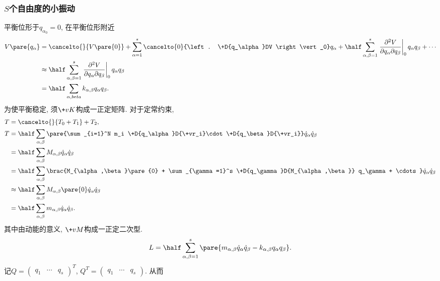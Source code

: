 \documentclass{ctexart}
\begin{document}

\subsubsection{\texorpdfstring{$S$}{S}个自由度的小振动} %
\label{ssub:s个自由度的小振动}

平衡位形于$q_{\alpha_0} = 0$, 在平衡位形附近
\begin{align*}
    V\pare{q_\alpha} &= \cancelto{}{V\pare{0}} + \sum_{\alpha=1}^s \cancelto{0}{\left. \+D{q_\alpha}DV \right\vert_0} q_\alpha + \half\sum_{\alpha,\beta=1}^s \left. \frac{\partial^2 V}{\partial q_\alpha \partial q_\beta} \right\vert_0 q_\alpha q_\beta + \cdots \\
    &\approx \half\sum_{\alpha,\beta=1}^s \left. \frac{\partial^2 V}{\partial q_\alpha \partial q_\beta} \right\vert_0 q_\alpha q_\beta \\
    &= \half \sum_{\alpha,beta} k_{\alpha,\beta} q_\alpha q_\beta.
\end{align*}
为使平衡稳定, 须$\+vK$构成一正定矩阵. 对于定常约束,
\begin{align*}
    T &= \cancelto{}{T_0 + T_1} + T_2, \\
    T &= \half \sum_{\alpha,\beta} \pare{\sum_{i=1}^N m_i \+D{q_\alpha}D{\+vr_i}\cdot \+D{q_\beta}D{\+vr_i}} \dot{q}_\alpha \dot{q}_\beta\\
    &= \half \sum_{\alpha,\beta} M_{\alpha,\beta}\dot{q}_\alpha \dot{q}_\beta \\
    &= \half \sum_{\alpha,\beta} \brac{M_{\alpha,\beta}\pare{0} + \sum_{\gamma=1}^s \+D{q_\gamma}D{M_{\alpha,\beta}} q_\gamma + \cdots}\dot{q}_\alpha \dot{q}_\beta \\
    &\approx \half \sum_{\alpha,\beta} M_{\alpha,\beta}\pare{0} \dot{q}_\alpha \dot{q}_\beta \\
    &= \half \sum_{\alpha,\beta} m_{\alpha,\beta}\dot{q}_\alpha \dot{q}_\beta.
\end{align*}
其中由动能的意义, $\+vM$构成一正定二次型.
\[ L = \half \sum_{\alpha,\beta=1}^s \pare{m_{\alpha,\beta} \dot{q}_\alpha \dot{q}_\beta - k_{\alpha,\beta}q_\alpha q_\beta}. \]
记$Q = \begin{pmatrix}
    q_1 & \cdots & q_s
\end{pmatrix}^T$, $Q^T = \begin{pmatrix}
    q_1 & \cdots & q_s
\end{pmatrix}$. 从而
\end{document}
